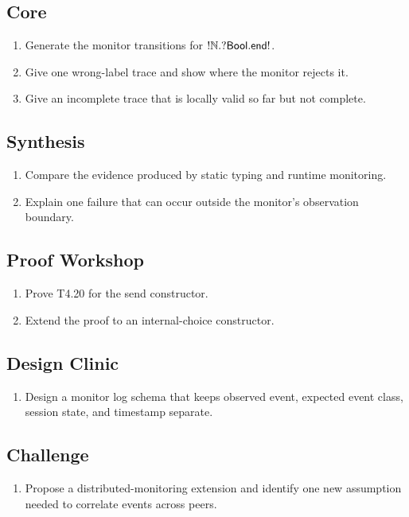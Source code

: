 \subsection*{Core}
\begin{enumerate}[label=\textbf{12.\arabic*},start=4]
\item Generate the monitor transitions for $!\mathbb{N}.?\mathsf{Bool}.\mathsf{end!}$.
\item Give one wrong-label trace and show where the monitor rejects it.
\item Give an incomplete trace that is locally valid so far but not complete.
\end{enumerate}
\subsection*{Synthesis}
\begin{enumerate}[label=\textbf{12.\arabic*},start=7]
\item Compare the evidence produced by static typing and runtime monitoring.
\item Explain one failure that can occur outside the monitor's observation boundary.
\end{enumerate}
\subsection*{Proof Workshop}
\begin{enumerate}[label=\textbf{12.\arabic*},start=9]
\item Prove T4.20 for the send constructor.
\item Extend the proof to an internal-choice constructor.
\end{enumerate}
\subsection*{Design Clinic}
\begin{enumerate}[label=\textbf{12.\arabic*},start=11]
\item Design a monitor log schema that keeps observed event, expected event class, session state, and timestamp separate.
\end{enumerate}
\subsection*{Challenge}
\begin{enumerate}[label=\textbf{12.\arabic*},start=12]
\item Propose a distributed-monitoring extension and identify one new assumption needed to correlate events across peers.
\end{enumerate}
